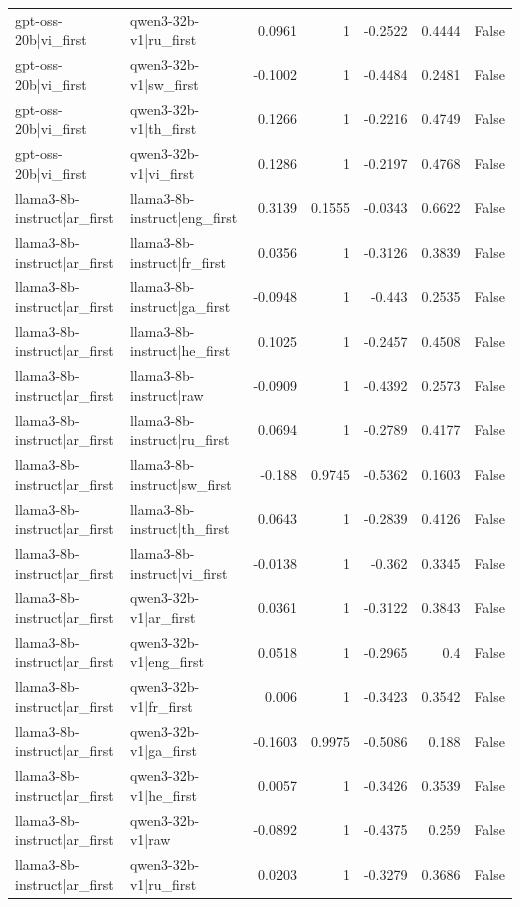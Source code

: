 \begin{table}
\begin{tabular}{l l r r r r l}
gpt-oss-20b|vi_first & qwen3-32b-v1|ru_first & 0.0961 & 1 & -0.2522 & 0.4444 & False \\
gpt-oss-20b|vi_first & qwen3-32b-v1|sw_first & -0.1002 & 1 & -0.4484 & 0.2481 & False \\
gpt-oss-20b|vi_first & qwen3-32b-v1|th_first & 0.1266 & 1 & -0.2216 & 0.4749 & False \\
gpt-oss-20b|vi_first & qwen3-32b-v1|vi_first & 0.1286 & 1 & -0.2197 & 0.4768 & False \\
llama3-8b-instruct|ar_first & llama3-8b-instruct|eng_first & 0.3139 & 0.1555 & -0.0343 & 0.6622 & False \\
llama3-8b-instruct|ar_first & llama3-8b-instruct|fr_first & 0.0356 & 1 & -0.3126 & 0.3839 & False \\
llama3-8b-instruct|ar_first & llama3-8b-instruct|ga_first & -0.0948 & 1 & -0.443 & 0.2535 & False \\
llama3-8b-instruct|ar_first & llama3-8b-instruct|he_first & 0.1025 & 1 & -0.2457 & 0.4508 & False \\
llama3-8b-instruct|ar_first & llama3-8b-instruct|raw & -0.0909 & 1 & -0.4392 & 0.2573 & False \\
llama3-8b-instruct|ar_first & llama3-8b-instruct|ru_first & 0.0694 & 1 & -0.2789 & 0.4177 & False \\
llama3-8b-instruct|ar_first & llama3-8b-instruct|sw_first & -0.188 & 0.9745 & -0.5362 & 0.1603 & False \\
llama3-8b-instruct|ar_first & llama3-8b-instruct|th_first & 0.0643 & 1 & -0.2839 & 0.4126 & False \\
llama3-8b-instruct|ar_first & llama3-8b-instruct|vi_first & -0.0138 & 1 & -0.362 & 0.3345 & False \\
llama3-8b-instruct|ar_first & qwen3-32b-v1|ar_first & 0.0361 & 1 & -0.3122 & 0.3843 & False \\
llama3-8b-instruct|ar_first & qwen3-32b-v1|eng_first & 0.0518 & 1 & -0.2965 & 0.4 & False \\
llama3-8b-instruct|ar_first & qwen3-32b-v1|fr_first & 0.006 & 1 & -0.3423 & 0.3542 & False \\
llama3-8b-instruct|ar_first & qwen3-32b-v1|ga_first & -0.1603 & 0.9975 & -0.5086 & 0.188 & False \\
llama3-8b-instruct|ar_first & qwen3-32b-v1|he_first & 0.0057 & 1 & -0.3426 & 0.3539 & False \\
llama3-8b-instruct|ar_first & qwen3-32b-v1|raw & -0.0892 & 1 & -0.4375 & 0.259 & False \\
llama3-8b-instruct|ar_first & qwen3-32b-v1|ru_first & 0.0203 & 1 & -0.3279 & 0.3686 & False \\

\end{tabular}
\end{table}
